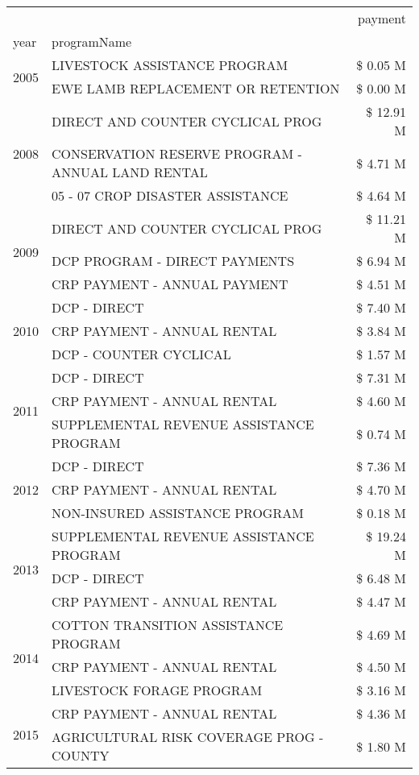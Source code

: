\begin{tabular}{llr}
\toprule
 &  & payment \\
year & programName &  \\
\midrule
\multirow[t]{2}{*}{2005} & LIVESTOCK ASSISTANCE PROGRAM & \$ 0.05 M \\
 & EWE LAMB REPLACEMENT OR RETENTION & \$ 0.00 M \\
\cline{1-3}
\multirow[t]{3}{*}{2008} & DIRECT AND COUNTER CYCLICAL PROG & \$ 12.91 M \\
 & CONSERVATION RESERVE PROGRAM - ANNUAL LAND RENTAL & \$ 4.71 M \\
 & 05 - 07 CROP DISASTER ASSISTANCE & \$ 4.64 M \\
\cline{1-3}
\multirow[t]{3}{*}{2009} & DIRECT AND COUNTER CYCLICAL PROG & \$ 11.21 M \\
 & DCP PROGRAM - DIRECT PAYMENTS & \$ 6.94 M \\
 & CRP PAYMENT - ANNUAL PAYMENT & \$ 4.51 M \\
\cline{1-3}
\multirow[t]{3}{*}{2010} & DCP - DIRECT & \$ 7.40 M \\
 & CRP PAYMENT - ANNUAL RENTAL & \$ 3.84 M \\
 & DCP - COUNTER CYCLICAL & \$ 1.57 M \\
\cline{1-3}
\multirow[t]{3}{*}{2011} & DCP - DIRECT & \$ 7.31 M \\
 & CRP PAYMENT - ANNUAL RENTAL & \$ 4.60 M \\
 & SUPPLEMENTAL REVENUE ASSISTANCE PROGRAM & \$ 0.74 M \\
\cline{1-3}
\multirow[t]{3}{*}{2012} & DCP - DIRECT & \$ 7.36 M \\
 & CRP PAYMENT - ANNUAL RENTAL & \$ 4.70 M \\
 & NON-INSURED ASSISTANCE PROGRAM & \$ 0.18 M \\
\cline{1-3}
\multirow[t]{3}{*}{2013} & SUPPLEMENTAL REVENUE ASSISTANCE PROGRAM & \$ 19.24 M \\
 & DCP - DIRECT & \$ 6.48 M \\
 & CRP PAYMENT - ANNUAL RENTAL & \$ 4.47 M \\
\cline{1-3}
\multirow[t]{3}{*}{2014} & COTTON TRANSITION ASSISTANCE PROGRAM & \$ 4.69 M \\
 & CRP PAYMENT - ANNUAL RENTAL & \$ 4.50 M \\
 & LIVESTOCK FORAGE PROGRAM & \$ 3.16 M \\
\cline{1-3}
\multirow[t]{3}{*}{2015} & CRP PAYMENT - ANNUAL RENTAL & \$ 4.36 M \\
 & AGRICULTURAL RISK COVERAGE PROG - COUNTY & \$ 1.80 M \\

\end{tabular}
